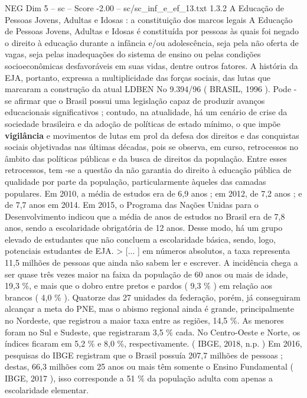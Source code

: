 \begin{textsample}{NEG Dim 5 – sc – Score -2.00 – sc/sc\_inf\_e\_ef\_13.txt}  \label{ex:f5_neg_251}
1.3.2 A Educação de Pessoas Jovens, Adultas e Idosas : a constituição dos marcos legais A Educação de Pessoas Jovens, Adultas e Idosas é constituída por pessoas às quais foi negado o direito à educação durante a infância e/ou adolescência, seja pela não oferta de vagas, seja pelas inadequações do sistema de ensino ou pelas condições socioeconômicas desfavoráveis em suas vidas, dentre outros fatores.
A história da EJA, portanto, expressa a multiplicidade das forças sociais, das lutas que marcaram a construção da atual LDBEN No 9.394/96 ( BRASIL, 1996 ).
Pode -se afirmar que o Brasil possui uma legislação capaz de produzir avanços educacionais significativos ; contudo, na atualidade, há um cenário de crise da sociedade brasileira e da adoção de políticas de estado mínimo, o que impõe \textbf{vigilância} e movimentos de lutas em prol da defesa dos direitos e das conquistas sociais objetivadas nas últimas décadas, pois se observa, em curso, retrocessos no âmbito das políticas públicas e da busca de direitos da população.
Entre esses retrocessos, tem -se a questão da não garantia do direito à educação pública de qualidade por parte da população, particularmente àqueles das camadas populares.
Em 2010, a média de estudos era de 6,9 anos ; em 2012, de 7,2 anos ; e de 7,7 anos em 2014.
Em 2015, o Programa das Nações Unidas para o Desenvolvimento indicou que a média de anos de estudos no Brasil era de 7,8 anos, sendo a escolaridade obrigatória de 12 anos.
Desse modo, há um grupo elevado de estudantes que não concluem a escolaridade básica, sendo, logo, potenciais estudantes de EJA. > [... ] em números absolutos, a taxa representa 11,5 milhões de pessoas que ainda não sabem ler e escrever.
A incidência chega a ser quase três vezes maior na faixa da população de 60 anos ou mais de idade, 19,3 \%, e mais que o dobro entre pretos e pardos ( 9,3 \% ) em relação aos brancos ( 4,0 \% ).
Quatorze das 27 unidades da federação, porém, já conseguiram alcançar a meta do PNE, mas o abismo regional ainda é grande, principalmente no Nordeste, que registrou a maior taxa entre as regiões, 14,5 \%.
As menores foram no Sul e Sudeste, que registraram 3,5 \% cada.
No Centro-Oeste e Norte, os índices ficaram em 5,2 \% e 8,0 \%, respectivamente. ( IBGE, 2018, n.p. ) Em 2016, pesquisas do IBGE registram que o Brasil possuía 207,7 milhões de pessoas ; destas, 66,3 milhões com 25 anos ou mais têm somente o Ensino Fundamental ( IBGE, 2017 ), isso corresponde a 51 \% da população adulta com apenas a escolaridade elementar.

\end{textsample}
